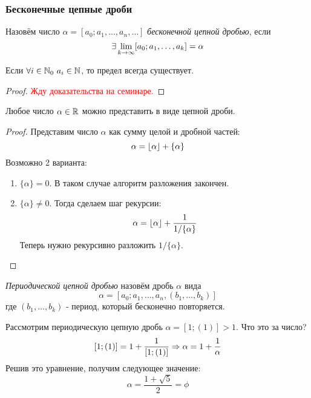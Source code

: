 \subsubsection*{Бесконечные цепные дроби}

\begin{definition}
	Назовём число $\alpha = [a_0; a_1, \ldots, a_n, \ldots]$ \textit{бесконечной цепной дробью}, если
	\[
		\exists \lim\limits_{k \to \infty} [a_0; a_1, \ldots, a_k] = \alpha
	\]
\end{definition}

\begin{theorem}
	Если $\forall i \in \mathbb{N}_0\ a_i \in \mathbb{N}$, то предел всегда существует.
\end{theorem}

\begin{proof}
	\textcolor{red}{Жду доказательства на семинаре.}
\end{proof}

\begin{proposition}
	Любое число $\alpha \in \mathbb{R}$ можно представить в виде цепной дроби.
\end{proposition}

\begin{proof}
	Представим число $\alpha$ как сумму целой и дробной частей:
	\[
		\alpha = \left\lfloor \alpha \right\rfloor + \{\alpha\}
	\]
	Возможно 2 варианта:
	\begin{enumerate}
		\item $\{\alpha\} = 0$. В таком случае алгоритм разложения закончен.
		
		\item $\{\alpha\} \neq 0$. Тогда сделаем шаг рекурсии:
		\[
			\alpha = \left\lfloor \alpha \right\rfloor + \frac{1}{1 / \{\alpha\}}
		\]
		Теперь нужно рекурсивно разложить $1 / \{\alpha\}$.
	\end{enumerate}
\end{proof}

\begin{definition}
	\textit{Периодической цепной дробью} назовём дробь $\alpha$ вида
	\[
		\alpha = [a_0; a_1, \ldots, a_n, (b_1, \ldots, b_k)]
	\]
	где $(b_1, \ldots, b_k)$ - период, который бесконечно повторяется.
\end{definition}

\begin{example}
	Рассмотрим периодическую цепную дробь $\alpha = [1; (1)] > 1$. Что это за число?
	\[
		[1; (1)] = 1 + \frac{1}{[1; (1)]} \Rightarrow \alpha = 1 + \frac{1}{\alpha}
	\]
	Решив это уравнение, получим следующее значение:
	\[
		\alpha = \frac{1 + \sqrt{5}}{2} = \phi
	\]
\end{example}

